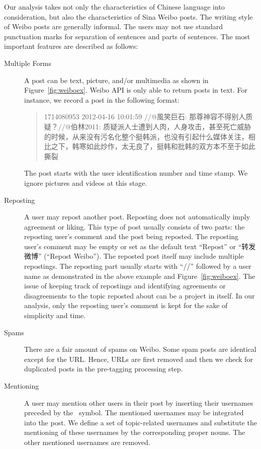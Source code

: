 \documentclass[11pt]{article}
\newcommand{\1}[1]{{\mathbf 1}\left\{#1\right\}}        %
\begin{document}
Our analysis takes not only the characteristics of Chinese language into consideration, but also the characteristics of Sina Weibo posts.
The writing style of Weibo posts are generally informal. The users may not use standard punctuation marks for separation of sentences and parts of sentences. The most important features are described as follows:
\begin{description}
\item[Multiple Forms] A post can be text, picture, and/or multimedia as shown in Figure~\ref{fig:weiboex}. Weibo API is only able to return posts in text. For instance, we record a post in the following format:
\begin{quote}
1714080953 2012-04-16 10:01:59 //@風笑巨石: 那尊神容不得别人质疑？//@伯林2011: 
质疑派人士遭到人肉，人身攻击，甚至死亡威胁的时候，从来没有污名化整个挺韩派，也没有引起什么媒体关注，相比之下，韩寒如此炒作，太无良了，挺韩和批韩的双方本不至于如此撕裂
\end{quote}
The post starts with the user identification number and time stamp. We ignore pictures and videos at this stage. 

\item[Reposting] A user may repost another post. Reposting does not automatically imply agreement or liking. This type of post usually consists of two parts: the reposting user's comment and the post being reposted. The reposting user's comment may be empty or set as the default text ``Repost'' or ``转发微博'' (``Repost Weibo''). The reposted post itself may include multiple repostings. The reposting part usually starts with  ``//\MVAt'' followed by a user name as demonstrated in the above example and Figure~\ref{fig:weiboex}. The issue of keeping track of repostings and identifying agreements or disagreements to the topic reposted about can be a project in itself. In our analysis, only the reposting user's comment is kept for the sake of simplicity and time.  

\item[Spams] There are a fair amount of spams on Weibo. Some spam posts are identical except for the URL. Hence, URLs are first removed and then we check for duplicated posts in the pre-tagging processing step.

\item[Mentioning] A user may mention other users in their post by inserting their usernames preceded by the \MVAt\  symbol. The mentioned usernames may be integrated into the post. We define a set of topic-related usernames and substitute the mentioning of these usernames by the corresponding proper nouns. The other mentioned usernames are removed.


\end{description}
\end{document}
